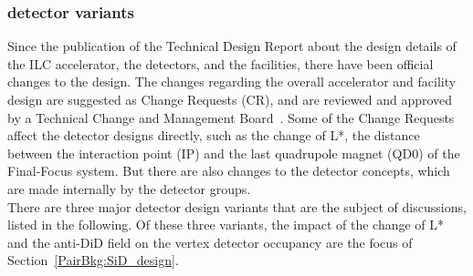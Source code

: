\subsubsection{\sid detector variants}
\label{ILC:SiD:variants}
Since the publication of the Technical Design Report about the design details of the ILC accelerator, the detectors, and the facilities, there have been official changes to the design.
The changes regarding the overall accelerator and facility design are suggested as Change Requests (CR), and are reviewed and approved by a Technical Change and Management Board~\cite{TCMB}. 
Some of the Change Requests affect the detector designs directly, such as the change of L*, the distance between the interaction point (IP) and the last quadrupole magnet (QD0) of the Final-Focus system.
But there are also changes to the detector concepts, which are made internally by the detector groups.\\
There are three major \sid detector design variants that are the subject of discussions, listed in the following.
Of these three variants, the impact of the change of L* and the anti-DiD field on the vertex detector occupancy are the focus of Section~\ref{PairBkg:SiD_design}.
